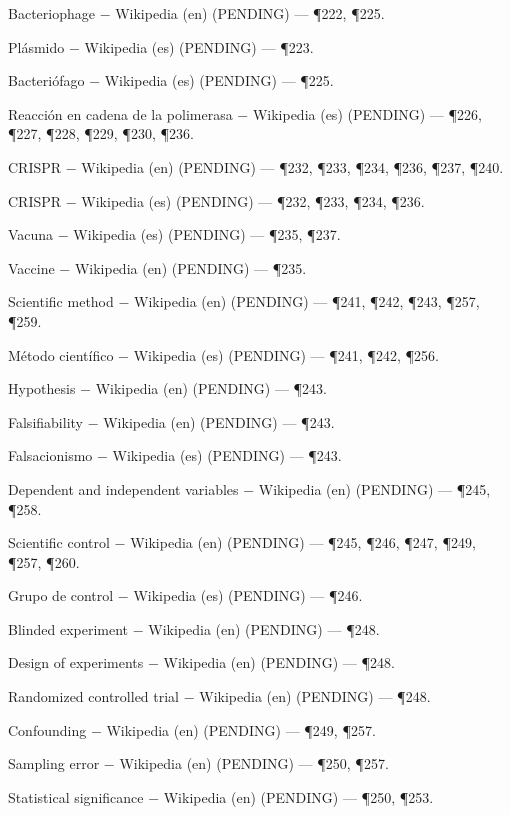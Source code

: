 \documentclass{book}
\begin{document}
\noindent Bacteriophage \(-\) Wikipedia (en) (PENDING) --- \P222, \P225.

\noindent Plásmido \(-\) Wikipedia (es) (PENDING) --- \P223.

\noindent Bacteriófago \(-\) Wikipedia (es) (PENDING) --- \P225.

\noindent Reacción en cadena de la polimerasa \(-\) Wikipedia (es) (PENDING) --- \P226, \P227, \P228, \P229, \P230, \P236.

\noindent CRISPR \(-\) Wikipedia (en) (PENDING) --- \P232, \P233, \P234, \P236, \P237, \P240.

\noindent CRISPR \(-\) Wikipedia (es) (PENDING) --- \P232, \P233, \P234, \P236.

\noindent Vacuna \(-\) Wikipedia (es) (PENDING) --- \P235, \P237.

\noindent Vaccine \(-\) Wikipedia (en) (PENDING) --- \P235.

\noindent Scientific method \(-\) Wikipedia (en) (PENDING) --- \P241, \P242, \P243, \P257, \P259.

\noindent Método científico \(-\) Wikipedia (es) (PENDING) --- \P241, \P242, \P256.

\noindent Hypothesis \(-\) Wikipedia (en) (PENDING) --- \P243.

\noindent Falsifiability \(-\) Wikipedia (en) (PENDING) --- \P243.

\noindent Falsacionismo \(-\) Wikipedia (es) (PENDING) --- \P243.

\noindent Dependent and independent variables \(-\) Wikipedia (en) (PENDING) --- \P245, \P258.

\noindent Scientific control \(-\) Wikipedia (en) (PENDING) --- \P245, \P246, \P247, \P249, \P257, \P260.

\noindent Grupo de control \(-\) Wikipedia (es) (PENDING) --- \P246.

\noindent Blinded experiment \(-\) Wikipedia (en) (PENDING) --- \P248.

\noindent Design of experiments \(-\) Wikipedia (en) (PENDING) --- \P248.

\noindent Randomized controlled trial \(-\) Wikipedia (en) (PENDING) --- \P248.

\noindent Confounding \(-\) Wikipedia (en) (PENDING) --- \P249, \P257.

\noindent Sampling error \(-\) Wikipedia (en) (PENDING) --- \P250, \P257.

\noindent Statistical significance \(-\) Wikipedia (en) (PENDING) --- \P250, \P253.
\end{document}
